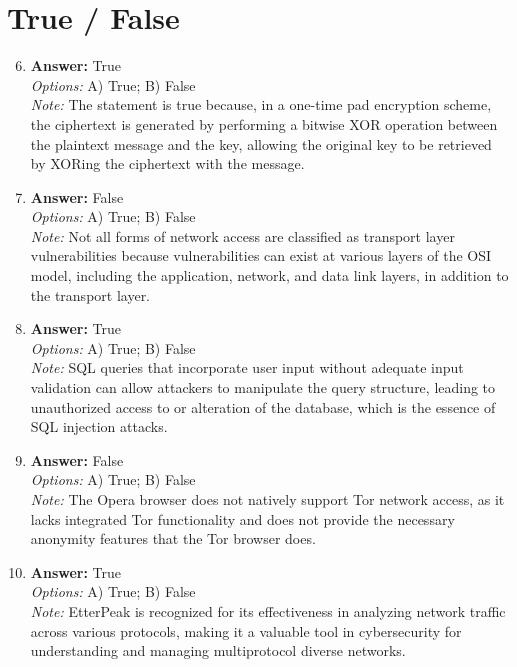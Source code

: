 \documentclass[12pt]{article}
\begin{document}
\section*{True / False}
\begin{enumerate}[label=\arabic*.]
\setcounter{enumi}{5}
\item \textbf{Answer:} True
\\ \textit{Options:} A) True; B) False
\\ \textit{Note:} The statement is true because, in a one-time pad encryption scheme, the ciphertext is generated by performing a bitwise XOR operation between the plaintext message and the key, allowing the original key to be retrieved by XORing the ciphertext with the message.
\item \textbf{Answer:} False
\\ \textit{Options:} A) True; B) False
\\ \textit{Note:} Not all forms of network access are classified as transport layer vulnerabilities because vulnerabilities can exist at various layers of the OSI model, including the application, network, and data link layers, in addition to the transport layer.
\item \textbf{Answer:} True
\\ \textit{Options:} A) True; B) False
\\ \textit{Note:} SQL queries that incorporate user input without adequate input validation can allow attackers to manipulate the query structure, leading to unauthorized access to or alteration of the database, which is the essence of SQL injection attacks.
\item \textbf{Answer:} False
\\ \textit{Options:} A) True; B) False
\\ \textit{Note:} The Opera browser does not natively support Tor network access, as it lacks integrated Tor functionality and does not provide the necessary anonymity features that the Tor browser does.
\item \textbf{Answer:} True
\\ \textit{Options:} A) True; B) False
\\ \textit{Note:} EtterPeak is recognized for its effectiveness in analyzing network traffic across various protocols, making it a valuable tool in cybersecurity for understanding and managing multiprotocol diverse networks.
\end{enumerate}
\end{document}

